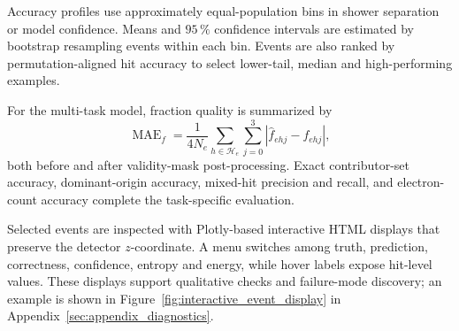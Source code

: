 Accuracy profiles use approximately equal-population bins in shower
separation or model confidence. Means and \(95\,\%\) confidence intervals are
estimated by bootstrap resampling events within each bin. Events are also
ranked by permutation-aligned hit accuracy to select lower-tail, median and
high-performing examples.

For the multi-task model, fraction quality is summarized by
\begin{equation}
    \operatorname{MAE}_{f}
    =
    \frac{1}{4N_e}
    \sum_{h \in \mathcal{H}_e}
    \sum_{j=0}^{3}
    \left|\widehat{f}_{ehj}-f_{ehj}\right|,
    \label{eq:fraction_mae}
\end{equation}
both before and after validity-mask post-processing. Exact contributor-set
accuracy, dominant-origin accuracy, mixed-hit precision and recall, and
electron-count accuracy complete the task-specific evaluation.

Selected events are inspected with Plotly-based interactive HTML displays that
preserve the detector \(z\)-coordinate. A menu switches among truth,
prediction, correctness, confidence, entropy and energy, while hover labels
expose hit-level values. These displays support qualitative checks and
failure-mode discovery; an example is shown in
Figure~\ref{fig:interactive_event_display} in
Appendix~\ref{sec:appendix_diagnostics}.
